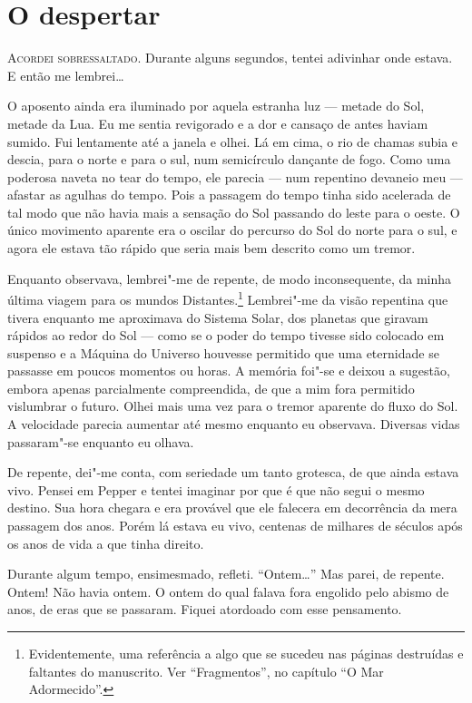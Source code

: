 \clearpage

\chapter{O despertar}

\textsc{Acordei sobressaltado.} Durante alguns segundos, tentei adivinhar onde estava. E então me lembrei\ldots{}

O aposento ainda era iluminado por aquela estranha luz --- metade do Sol, metade da Lua. Eu me sentia revigorado e a dor
e cansaço de antes haviam sumido. Fui lentamente até a janela e olhei. Lá em cima, o rio de chamas subia e descia,
para o norte e para o sul, num semicírculo dançante de fogo. Como uma poderosa naveta no tear do tempo, ele parecia ---
num repentino devaneio meu --- afastar as agulhas do tempo. Pois a passagem do tempo tinha sido acelerada de tal modo que
não havia mais a sensação do Sol passando do leste para o oeste. O único movimento aparente era o oscilar do percurso
do Sol do norte para o sul, e agora ele estava tão rápido que seria mais bem descrito como um tremor.

Enquanto observava, lembrei"-me de repente, de modo inconsequente, da minha última viagem para os mundos Distantes.\footnote{ Evidentemente, 
uma referência a algo que se sucedeu nas páginas destruídas e faltantes do manuscrito. Ver ``Fragmentos'', no capítulo
``O Mar Adormecido''.} Lembrei"-me da visão repentina que tivera enquanto me aproximava do Sistema Solar, dos planetas que giravam
rápidos ao redor do Sol --- como se o poder do tempo tivesse sido colocado em suspenso e a Máquina do Universo houvesse permitido que
uma eternidade se passasse em poucos momentos ou horas. A memória foi"-se e deixou a sugestão, embora apenas
parcialmente compreendida, de que a mim fora permitido vislumbrar o futuro. Olhei mais uma vez para o tremor aparente
do fluxo do Sol. A velocidade parecia aumentar até mesmo enquanto eu observava. Diversas vidas passaram"-se enquanto eu
olhava.

De repente, dei"-me conta, com seriedade um tanto grotesca, de que ainda estava vivo. Pensei em Pepper e tentei imaginar
por que é que não segui o mesmo destino. Sua hora chegara e era provável que ele falecera em decorrência da mera passagem
dos anos. Porém lá estava eu vivo, centenas de milhares de séculos após os anos de vida a que tinha direito.

Durante algum tempo, ensimesmado, refleti. ``Ontem\ldots{}'' Mas parei, de repente. Ontem! Não havia ontem. O ontem do
qual falava fora engolido pelo abismo de anos, de eras que se passaram. Fiquei atordoado com esse pensamento.

